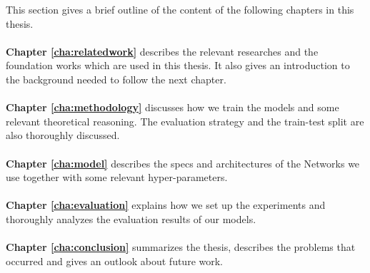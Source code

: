 This section gives a brief outline of the content of the following chapters in this
thesis.
\\
\\
\textbf{Chapter \ref{cha:relatedwork}} describes the relevant researches and the
foundation works which are used in this thesis. It also gives an introduction to the
background needed to follow the next chapter.
\\
\\
\textbf{Chapter \ref{cha:methodology}} discusses how we train the models and some relevant
theoretical reasoning. The evaluation strategy and the train-test split are also
thoroughly discussed.
\\
\\
\textbf{Chapter \ref{cha:model}} describes the specs and architectures of the Networks we
use together with some relevant hyper-parameters.
\\
\\
\textbf{Chapter \ref{cha:evaluation}} explains how we set up the experiments and
thoroughly analyzes  the evaluation results of our models.
\\
\\
\textbf{Chapter \ref{cha:conclusion}} summarizes the thesis, describes the problems that
occurred and gives an outlook about future work.
